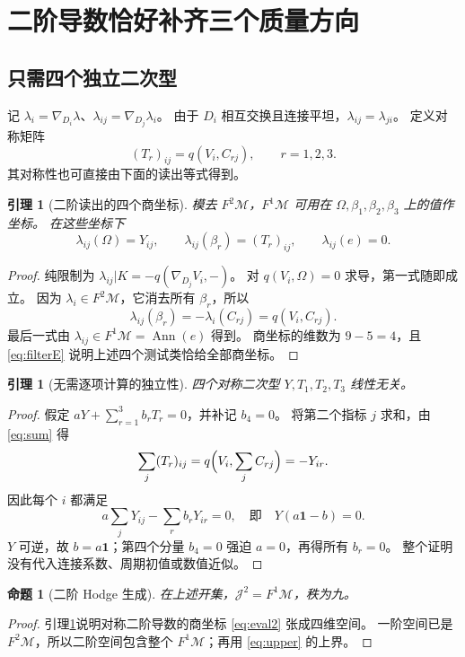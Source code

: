 \documentclass[11pt,a4paper]{ctexart}
\theoremstyle{cnplain}
\newtheorem{proposition}[theorem]{命题}
\newtheorem{lemma}[theorem]{引理}
\theoremstyle{definition}
\theoremstyle{remark}
\newcommand{\Ann}{\operatorname{Ann}}
\newcommand{\cM}{\mathcal M}
\begin{document}
\section{二阶导数恰好补齐三个质量方向}
\subsection{只需四个独立二次型}
记 $\lambda_i=\nabla_{D_i}\lambda$、$\lambda_{ij}=\nabla_{D_j}\lambda_i$。
由于 $D_i$ 相互交换且连接平坦，$\lambda_{ij}=\lambda_{ji}$。
定义对称矩阵
\begin{equation}\label{eq:T}
 (T_r)_{ij}=q(V_i,C_{rj}),\qquad r=1,2,3.
\end{equation}
其对称性也可直接由下面的读出等式得到。

\begin{lemma}[二阶读出的四个商坐标]\label{lem:second}
模去 $F^2\cM$，$F^1\cM$ 可用在 $\Omega,\beta_1,\beta_2,\beta_3$ 上的值作坐标。
在这些坐标下
\begin{equation}\label{eq:eval2}
 \lambda_{ij}(\Omega)=Y_{ij},\qquad
 \lambda_{ij}(\beta_r)=(T_r)_{ij},\qquad
 \lambda_{ij}(e)=0.
\end{equation}
\end{lemma}
\begin{proof}
纯限制为 $\lambda_{ij}|K=-q(\nabla_{D_j}V_i,-)$。
对 $q(V_i,\Omega)=0$ 求导，第一式随即成立。
因为 $\lambda_i\in F^2\cM$，它消去所有 $\beta_r$，所以
\[
 \lambda_{ij}(\beta_r)=-\lambda_i(C_{rj})=q(V_i,C_{rj}).
\]
最后一式由 $\lambda_{ij}\in F^1\cM=\Ann(e)$ 得到。
商坐标的维数为 $9-5=4$，且 \eqref{eq:filterE} 说明上述四个测试类恰给全部商坐标。
\end{proof}

\begin{lemma}[无需逐项计算的独立性]\label{lem:independent}
四个对称二次型 $Y,T_1,T_2,T_3$ 线性无关。
\end{lemma}
\begin{proof}
假定 $aY+\sum_{r=1}^3b_rT_r=0$，并补记 $b_4=0$。
将第二个指标 $j$ 求和，由 \eqref{eq:sum} 得
\[
 \sum_j(T_r)_{ij}
 =q\Bigl(V_i,\sum_jC_{rj}\Bigr)=-Y_{ir}.
\]
因此每个 $i$ 都满足
\[
 a\sum_jY_{ij}-\sum_rb_rY_{ir}=0,
 \quad\text{即}\quad Y(a\mathbf1-b)=0.
\]
$Y$ 可逆，故 $b=a\mathbf1$；第四个分量 $b_4=0$ 强迫 $a=0$，再得所有 $b_r=0$。
整个证明没有代入连接系数、周期初值或数值近似。
\end{proof}

\begin{proposition}[二阶 Hodge 生成]\label{prop:jet2}
在上述开集，$\mathcal J^2=F^1\cM$，秩为九。
\end{proposition}
\begin{proof}
引理\ref{lem:independent}说明对称二阶导数的商坐标 \eqref{eq:eval2} 张成四维空间。
一阶空间已是 $F^2\cM$，所以二阶空间包含整个 $F^1\cM$；再用 \eqref{eq:upper} 的上界。
\end{proof}
\end{document}
